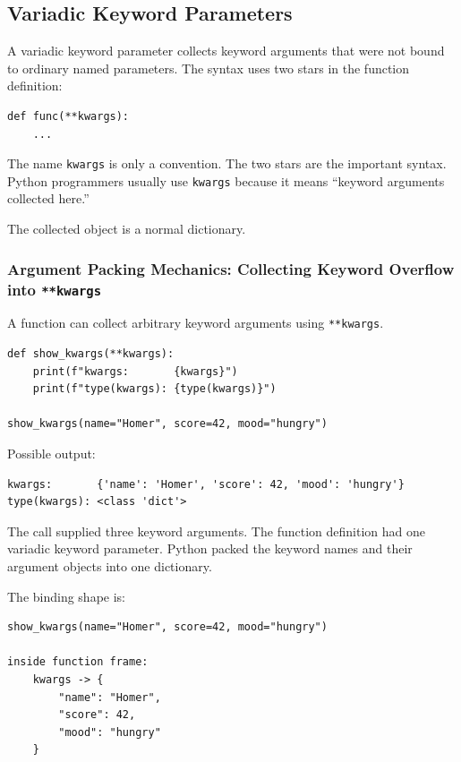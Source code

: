 \subsection{Variadic Keyword Parameters}

A variadic keyword parameter collects keyword arguments that were not bound to ordinary named parameters. The syntax uses two stars in the function definition:

\begin{verbatim}
def func(**kwargs):
    ...
\end{verbatim}

The name \texttt{kwargs} is only a convention. The two stars are the important syntax. Python programmers usually use \texttt{kwargs} because it means ``keyword arguments collected here.''

The collected object is a normal dictionary.

\subsubsection{Argument Packing Mechanics: Collecting Keyword Overflow into \texttt{**kwargs}}

A function can collect arbitrary keyword arguments using \texttt{**kwargs}.

\begin{verbatim}
def show_kwargs(**kwargs):
    print(f"kwargs:       {kwargs}")
    print(f"type(kwargs): {type(kwargs)}")

show_kwargs(name="Homer", score=42, mood="hungry")
\end{verbatim}

Possible output:

\begin{verbatim}
kwargs:       {'name': 'Homer', 'score': 42, 'mood': 'hungry'}
type(kwargs): <class 'dict'>
\end{verbatim}

The call supplied three keyword arguments. The function definition had one variadic keyword parameter. Python packed the keyword names and their argument objects into one dictionary.

The binding shape is:

\begin{verbatim}
show_kwargs(name="Homer", score=42, mood="hungry")

inside function frame:
    kwargs -> {
        "name": "Homer",
        "score": 42,
        "mood": "hungry"
    }
\end{verbatim}


